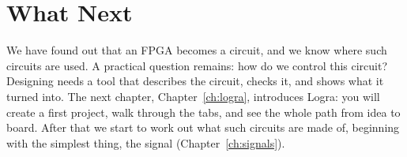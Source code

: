 \section{What Next}

We have found out that an FPGA becomes a circuit, and we know where such
circuits are used. A practical question remains: how do we control this
circuit? Designing needs a tool that describes the circuit, checks it, and
shows what it turned into. The next chapter, Chapter~\ref{ch:logra}, introduces
Logra: you will create a first project, walk through the tabs, and see the whole
path from idea to board. After that we start to work out what such circuits are
made of, beginning with the simplest thing, the signal (Chapter~\ref{ch:signals}).
